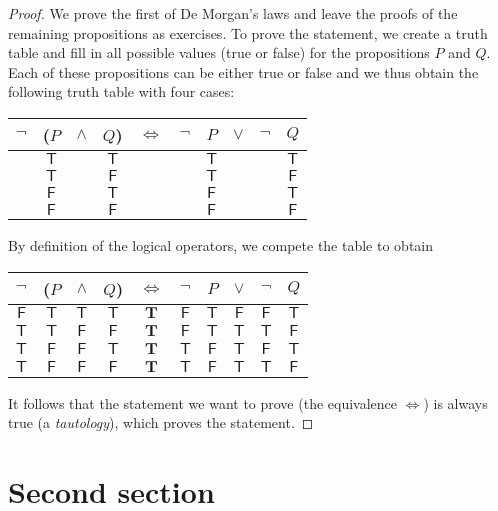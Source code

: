 \documentclass{tstextbook}
\begin{document}
    \begin{proof}
        \newcommand{\T}{\mathsf{T}}
        \newcommand{\TT}{\mathbf{T}}
        \renewcommand{\F}{\mathsf{F}}
        We prove the first of De Morgan's laws and leave the proofs of
        the remaining propositions as exercises. To prove the statement,
        we create a truth table and fill in all possible values (true or
        false) for the propositions $P$ and $Q$. Each of these propositions
        can be either true or false and we thus obtain the following truth
        table with four cases:
        \begin{center}
            \begin{tabular}{cccccccccc}
                $\lnot$ & ($P$ & $\land$ & $Q$) & $\Leftrightarrow$ & $\lnot$ & $P$ & $\lor$ & $\lnot$ & $Q$ \\
                \midrule
                & $\T$ && $\T$ &&& $\T$ &&& $\T$ \\
                & $\T$ && $\F$ &&& $\T$ &&& $\F$ \\
                & $\F$ && $\T$ &&& $\F$ &&& $\T$ \\
                & $\F$ && $\F$ &&& $\F$ &&& $\F$
            \end{tabular}
        \end{center}
        By definition of the logical operators, we compete the table to obtain
        \begin{center}
            \begin{tabular}{cccccccccc}
                $\lnot$ & ($P$ & $\land$ & $Q$) & $\Leftrightarrow$ & $\lnot$ & $P$ & $\lor$ & $\lnot$ & $Q$ \\
                \midrule
                $\F$ & $\T$ & $\T$ & $\T$ & $\TT$ & $\F$ & $\T$ & $\F$ & $\F$& $\T$ \\
                $\T$ & $\T$ & $\F$ & $\F$ & $\TT$ & $\F$ & $\T$ & $\T$ & $\T$& $\F$ \\
                $\T$ & $\F$ & $\F$ & $\T$ & $\TT$ & $\T$ & $\F$ & $\T$ & $\F$& $\T$ \\
                $\T$ & $\F$ & $\F$ & $\F$ & $\TT$ & $\T$ & $\F$ & $\T$ & $\T$& $\F$
            \end{tabular}
        \end{center}
        It follows that the statement we want to prove (the equivalence $\Leftrightarrow$)
        is always true (a \emph{tautology}), which proves the statement.
    \end{proof}

    \section{Second section}
\end{document}
